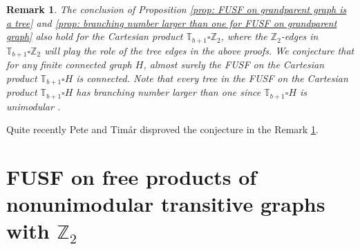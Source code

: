 \documentclass[12pt]{article}
\newtheorem{remark}[theorem]{Remark}
\numberwithin{equation}{section}
\newcommand{\1}{\mathbf{1}}
\begin{document}





\begin{remark}\label{rem: connected FUSF on tree cross finite graph}
	The conclusion of Proposition \ref{prop: FUSF on grandparent graph is a tree} and \ref{prop: branching number larger than one for FUSF on grandparent graph} also hold for the Cartesian product $\mathbb{T}_{b+1}\square \mathbb{Z}_2$, where the $\mathbb{Z}_2$-edges in  $\mathbb{T}_{b+1}\square \mathbb{Z}_2$ will play the role of the tree edges in the above proofs. We conjecture that for any finite connected graph $H$, almost surely the FUSF on the Cartesian product $\mathbb{T}_{b+1}\square H$ is connected. Note that every tree in the FUSF on the Cartesian product $\mathbb{T}_{b+1}\square H$  has branching number larger than one since $\mathbb{T}_{b+1}\square H$ is unimodular \cite{TomAsaf2017,Timar2018indis}. 
\end{remark}

Quite recently Pete and Tim\'{a}r  \cite{PeteTimar2020} disproved the conjecture in the Remark \ref{rem: connected FUSF on tree cross finite graph}. 



 
 
 \section[ \texorpdfstring{FUSF on free products of  nonunimodular transitive graphs with $\mathbb{Z}_2$}{FUSF on free products of nonunimodular transitive graphs with one edge}]{FUSF on  free products of nonunimodular transitive graphs with $\mathbb{Z}_2$}\label{sec: 6}
\end{document}
